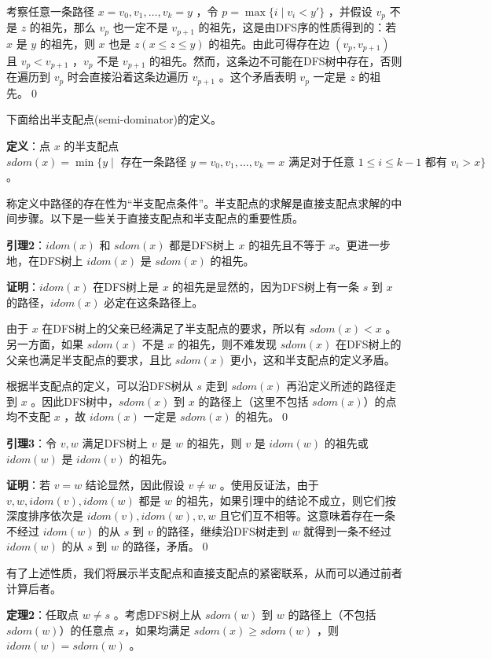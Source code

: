 \documentclass{noithesis}
\begin{document}
考察任意一条路径 $x=v_0, v_1, \dots, v_k = y$ ，令 $p=\max\{i\mid v_i<y'\}$ ，并假设 $v_p$ 不是 $z$ 的祖先，那么 $v_p$ 也一定不是 $v_{p+1}$ 的祖先，这是由DFS序的性质得到的：若 $x$ 是 $y$ 的祖先，则 $x$ 也是 $z(x\le z\le y)$ 的祖先。由此可得存在边 $(v_p, v_{p+1})$ 且 $v_p<v_{p+1}$ ，$v_p$ 不是 $v_{p+1}$ 的祖先。然而，这条边不可能在DFS树中存在，否则在遍历到 $v_p$ 时会直接沿着这条边遍历 $v_{p+1}$ 。这个矛盾表明 $v_p$ 一定是 $z$ 的祖先。\qed

下面给出半支配点(semi-dominator)的定义。

\textbf{定义}：点 $x$ 的半支配点 $sdom(x) = \min\{y \mid\text{ 存在一条路径\ }y=v_0,v_1,\dots,v_k=x\text{ 满足对于任意\ }1\le i\le k-1\text{ 都有\ }v_i>x\}$ 。

称定义中路径的存在性为“半支配点条件”。半支配点的求解是直接支配点求解的中间步骤。以下是一些关于直接支配点和半支配点的重要性质。

\textbf{引理2}：$idom(x)$ 和 $sdom(x)$ 都是DFS树上 $x$ 的祖先且不等于 $x$。更进一步地，在DFS树上 $idom(x)$ 是 $sdom(x)$ 的祖先。

\textbf{证明}：$idom(x)$ 在DFS树上是 $x$ 的祖先是显然的，因为DFS树上有一条 $s$ 到 $x$ 的路径，$idom(x)$ 必定在这条路径上。

由于 $x$ 在DFS树上的父亲已经满足了半支配点的要求，所以有 $sdom(x)<x$ 。另一方面，如果 $sdom(x)$ 不是 $x$ 的祖先，则不难发现 $sdom(x)$ 在DFS树上的父亲也满足半支配点的要求，且比 $sdom(x)$ 更小，这和半支配点的定义矛盾。

根据半支配点的定义，可以沿DFS树从 $s$ 走到 $sdom(x)$ 再沿定义所述的路径走到 $x$ 。因此DFS树中，$sdom(x)$ 到 $x$ 的路径上（这里不包括 $sdom(x)$）的点均不支配 $x$ ，故 $idom(x)$ 一定是 $sdom(x)$ 的祖先。\qed

\textbf{引理3}：令 $v,w$ 满足DFS树上 $v$ 是 $w$ 的祖先，则 $v$ 是 $idom(w)$ 的祖先或 $idom(w)$ 是 $idom(v)$ 的祖先。

\textbf{证明}：若 $v=w$ 结论显然，因此假设 $v\neq w$ 。使用反证法，由于$v, w, idom(v), idom(w)$ 都是 $w$ 的祖先，如果引理中的结论不成立，则它们按深度排序依次是 $idom(v), idom(w), v, w$ 且它们互不相等。这意味着存在一条不经过 $idom(w)$ 的从 $s$ 到 $v$ 的路径，继续沿DFS树走到 $w$ 就得到一条不经过 $idom(w)$ 的从 $s$ 到 $w$ 的路径，矛盾。\qed

有了上述性质，我们将展示半支配点和直接支配点的紧密联系，从而可以通过前者计算后者。

\textbf{定理2}：任取点 $w\neq s$ 。考虑DFS树上从 $sdom(w)$ 到 $w$ 的路径上（不包括 $sdom(w)$）的任意点 $x$，如果均满足 $sdom(x)\ge sdom(w)$ ，则 $idom(w)=sdom(w)$ 。
\end{document}
